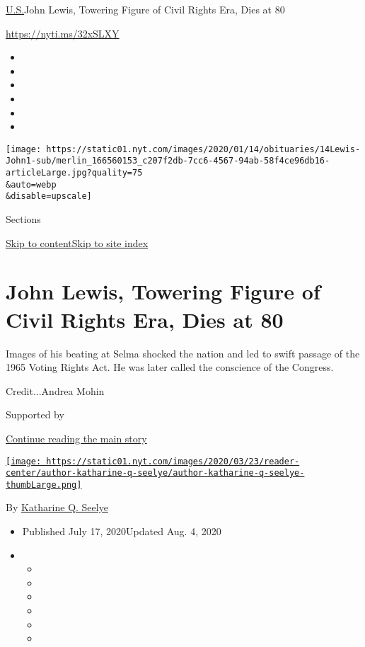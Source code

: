 \href{/section/us}{U.S.}\textbar{}John Lewis, Towering Figure of Civil
Rights Era, Dies at 80

\href{https://nyti.ms/32xSLXY}{https://nyti.ms/32xSLXY}

\begin{itemize}
\item
\item
\item
\item
\item
\item
\end{itemize}

\texttt{[image: https://static01.nyt.com/images/2020/01/14/obituaries/14Lewis-John1-sub/merlin\_166560153\_c207f2db-7cc6-4567-94ab-58f4ce96db16-articleLarge.jpg?quality=75\\\&auto=webp\\\&disable=upscale]}

Sections

\protect\hyperlink{site-content}{Skip to
content}\protect\hyperlink{site-index}{Skip to site index}

\hypertarget{john-lewis-towering-figure-of-civil-rights-era-dies-at-80}{%
\section{John Lewis, Towering Figure of Civil Rights Era, Dies at
80}\label{john-lewis-towering-figure-of-civil-rights-era-dies-at-80}}

Images of his beating at Selma shocked the nation and led to swift
passage of the 1965 Voting Rights Act. He was later called the
conscience of the Congress.

Credit...Andrea Mohin

Supported by

\protect\hyperlink{after-sponsor}{Continue reading the main story}

\href{https://www.nytimes.com/by/katharine-q-seelye}{\texttt{[image: https://static01.nyt.com/images/2020/03/23/reader-center/author-katharine-q-seelye/author-katharine-q-seelye-thumbLarge.png]}}

By \href{https://www.nytimes.com/by/katharine-q-seelye}{Katharine Q.
Seelye}

\begin{itemize}
\item
  Published July 17, 2020Updated Aug. 4, 2020
\item
  \begin{itemize}
  \item
  \item
  \item
  \item
  \item
  \item
  \end{itemize}
\end{itemize}

